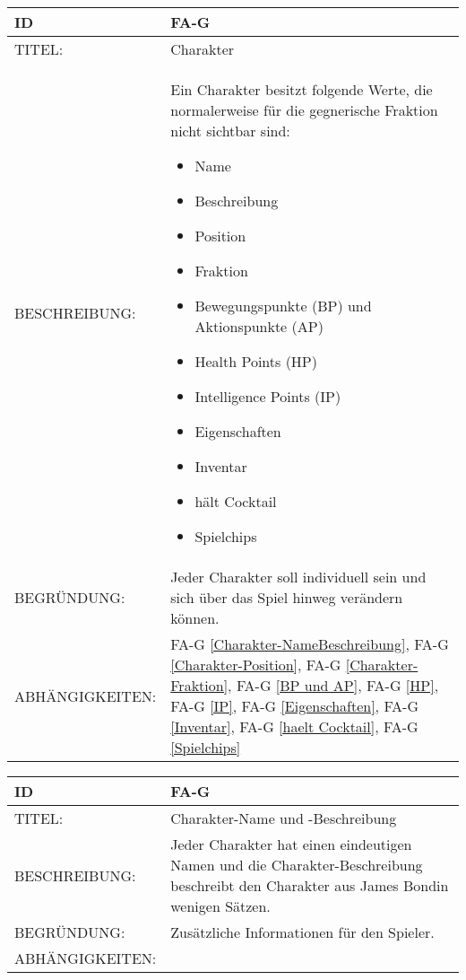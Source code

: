 
\begin{tabularx}{16cm}{l|X}
	{table}\label{Charakter}
	\textbf{ID} & \textbf{FA-G \arabic{table}} \\
	\hline
	TITEL: & Charakter \\
	\hline
	BESCHREIBUNG: & Ein Charakter besitzt folgende Werte, die normalerweise für die gegnerische Fraktion nicht sichtbar sind: 
	\begin{itemize}
		\item Name
		\item Beschreibung
		\item Position
		\item Fraktion
		\item Bewegungspunkte (BP) und Aktionspunkte (AP)
		\item Health Points (HP)
		\item Intelligence Points (IP)
		\item Eigenschaften
		\item Inventar
		\item hält Cocktail
		\item Spielchips
	\end{itemize}
	\\
	\hline
	BEGRÜNDUNG: & Jeder Charakter soll individuell sein und sich über das Spiel hinweg verändern können.\\
	\hline
	ABHÄNGIGKEITEN: & FA-G \ref{Charakter-NameBeschreibung}, FA-G \ref{Charakter-Position}, FA-G \ref{Charakter-Fraktion},  FA-G \ref{BP und AP}, FA-G \ref{HP}, FA-G \ref{IP}, FA-G \ref{Eigenschaften}, FA-G \ref{Inventar}, FA-G \ref{haelt Cocktail}, FA-G \ref{Spielchips} \\
\end{tabularx}

\begin{tabularx}{16cm}{l|X}
	{table}\label{Charakter-NameBeschreibung}
	\textbf{ID} & \textbf{FA-G \arabic{table}} \\
	\hline
	TITEL: & Charakter-Name und -Beschreibung \\
	\hline
	BESCHREIBUNG: & Jeder Charakter hat einen eindeutigen Namen und die Charakter-Beschreibung beschreibt den Charakter aus \glqq James Bond\grqq in wenigen Sätzen.\\
	\hline
	BEGRÜNDUNG: & Zusätzliche Informationen für den Spieler. \\
	\hline
	ABHÄNGIGKEITEN: & \\
\end{tabularx}

